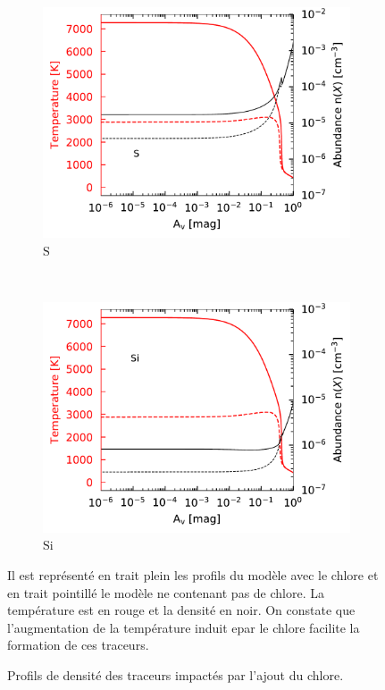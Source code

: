 \begin{appendices}
\begin{figure}[!h]
    \begin{subfigure}[t]{0.49\textwidth} %
        \centering \includegraphics[trim = {0 0 0 0},clip,width=1\textwidth]{figure/Cl/gridModelEmiss/nT_comp_S.pdf}
        \caption{$\mathrm{S}$}
    \end{subfigure}
    ~
    \begin{subfigure}[t]{0.49\textwidth} %
        \centering \includegraphics[trim = {0 0 0 0},clip,width=1\textwidth]{figure/Cl/gridModelEmiss/nT_comp_Si.pdf}
        \caption{$\mathrm{Si}$}
    \end{subfigure}
    
    \caption{Profils de densité des traceurs impactés par l'ajout du chlore.}
    \begin{minipage}{\textwidth}
    Il est représenté en trait plein les profils du modèle avec le chlore et en trait pointillé le modèle ne contenant pas de chlore. La température est en rouge et la densité en noir. On constate que l'augmentation de la température induit epar le chlore facilite la formation de ces traceurs. 
    \end{minipage}
    \label{fig:Cl:gridModelEmiss:nT:yes}
\end{figure}


\end{appendices}
